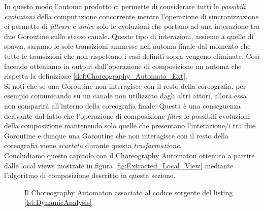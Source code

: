 In questo modo l'automa prodotto ci permette di considerare tutti le \emph{possibili evoluzioni} della computazione concorrente mentre l'operazione di sincronizzazione ci permette di \emph{filtrare} e \emph{unire} solo le evoluzioni che portano ad una interazione tra due Goroutine sullo stesso canale. Queste tipo di interazioni, assieme a quelle di spawn, saranno le sole transizioni ammesse nell'automa finale dal momento che tutte le transizioni che non rispettano i casi definiti sopra vengono eliminate. Così facendo otteniamo in output dall'operazione di composizione un automa che rispetta la definizione \ref{def:Choreography_Automata_Ext}.\bigskip \\
Si noti che se una Goroutine non interagisce con il resto della coreografia, per esempio comunicando su un canale non utilizzato dagli altri attori, allora essa non comparirà all'interno della coreografia finale. Questa è una conseguenza derivante dal fatto che l'operazione di composizione \emph{filtra} le possibili evoluzioni della composizione mantenendo solo quelle che presentano l'interazione/i tra due Goroutine e dunque una Goroutine che non interagisce con il resto della coreografia viene \emph{scartata} durante questa \emph{trasformazione}.\bigskip \\
Concludiamo questo capitolo con il Choreography Automaton ottenuto a partire dalle local views mostrate in figura \ref{fig:Extracted_Local_View} mediante l'algoritmo di composizione descritto in questa sezione.
\begin{figure}[h!]
    \centering
    \caption{Il Choreography Automaton associato al codice sorgente del listing \ref{lst:DynamicAnalysis}}
\end{figure}